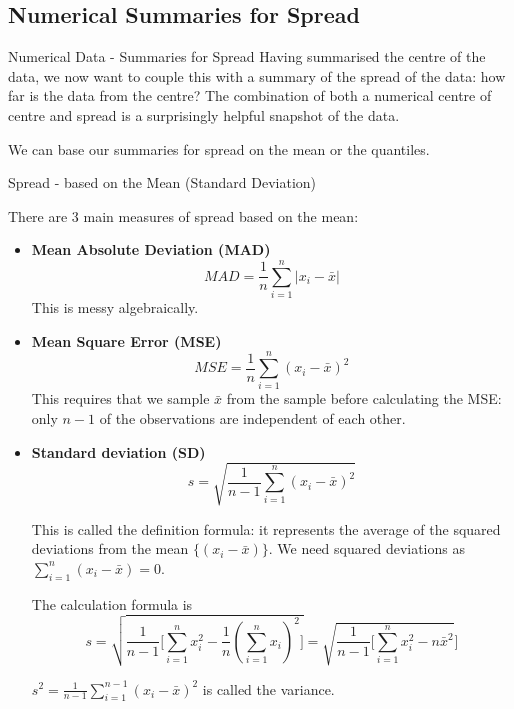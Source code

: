 \documentclass[t,xcolor=pdftex,dvipsnames,table]{beamer}
\begin{document}
\subsection[]{Numerical Summaries for Spread}
\begin{frame}[fragile]{Numerical Data - Summaries for Spread}
Having summarised the centre of the data, we now want to couple this with a summary of the spread of the data: how far is the data from the centre? The combination of both a numerical centre of centre and spread is a surprisingly helpful snapshot of the data.

\vspace{.5cm}
We can base our summaries for spread on the mean or the quantiles.
\end{frame}

\begin{frame}[fragile]{Spread - based on the Mean (Standard Deviation)}

There are 3 main measures of spread based on the mean:
\begin{itemize}
\item {\bf Mean Absolute Deviation (MAD)}
\[ MAD = \frac{1}{n} \sum_{i=1}^{n} | x_{i} - \bar{x} | \]
This is messy algebraically.

\vspace{.5cm}
\item {\bf Mean Square Error (MSE)}
\[ MSE = \frac{1}{n} \sum_{i=1}^{n} (x_{i} - \bar{x})^2 \]
This requires that we sample $\bar{x}$ from the sample before calculating the MSE: only $n-1$ of the observations are independent of each other.
\end{itemize}
\end{frame}

\begin{frame}[fragile]{}
\begin{itemize}
\item {\bf Standard deviation (SD)}
\[ s= \sqrt{\frac{1}{n-1}  \sum_{i=1}^{n} (x_{i} - \bar{x})^2 } \]

This is called the definition formula: it represents the average of the squared deviations from the mean $\{ (x_{i} - \bar{x}) \}$. We need squared deviations as $\sum_{i=1}^{n} (x_{i} - \bar{x}) = 0$.

\vspace{.5cm}
The calculation formula is
\[ s= \sqrt{\frac{1}{n-1} \big[ \sum_{i=1}^{n} x_{i}^2 - \frac{1}{n} (\sum_{i=1}^{n} x_{i})^2 \big] }
= \sqrt{ \frac{1}{n-1} \big[ \sum_{i=1}^{n} x_{i}^2 - n \bar{x}^2} \big]
\]

\vspace{.5cm}
$s^2 = \frac{1}{n-1} \sum_{i=1}^{n-1} (x_{i} - \bar{x})^2$ is called the variance. 
\end{itemize}
\end{frame}
\end{document}
